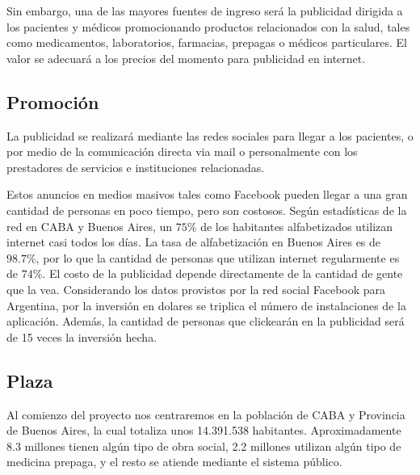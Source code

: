 \documentclass[a4paper,10pt]{article}
\begin{document}
Sin embargo, una de las mayores fuentes de ingreso será la publicidad dirigida a los pacientes y médicos promocionando productos relacionados con la salud, tales como medicamentos, laboratorios, farmacias, prepagas o médicos particulares. El valor se adecuará a los precios del momento para publicidad en internet.

\subsection{Promoción}

La publicidad se realizará mediante las redes sociales para llegar a los pacientes, o por medio de la comunicación directa via mail o personalmente con los prestadores de servicios e instituciones relacionadas.

Estos anuncios en medios masivos tales como Facebook pueden llegar a una gran cantidad de personas en poco tiempo, pero son costosos. Según estadísticas de la red en CABA y Buenos Aires, un $75\%$ de los habitantes alfabetizados utilizan internet casi todos los días. La tasa de alfabetización en Buenos Aires es de $98.7\%$, por lo que la cantidad de personas que utilizan internet regularmente es de $74\%$. El costo de la publicidad depende directamente de la cantidad de gente que la vea. Considerando los datos provistos por la red social Facebook para Argentina, por la inversión en dolares se triplica el número de instalaciones de la aplicación. Además, la cantidad de personas que clickearán en la publicidad será de 15 veces la inversión hecha.

\subsection{Plaza}

Al comienzo del proyecto nos centraremos en la población de CABA y Provincia de Buenos Aires, la cual totaliza unos 14.391.538 habitantes. Aproximadamente 8.3 millones tienen algún tipo de obra social, 2.2 millones utilizan algún tipo de medicina prepaga, y el resto se atiende mediante el sistema público. 
\end{document}
